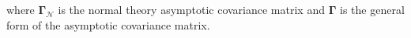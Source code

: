 \noindent where
$\boldsymbol{\Gamma}_{\mathcal{N}}$
is the normal theory asymptotic covariance matrix
and
$\boldsymbol{\Gamma}$
is the general form of the asymptotic covariance matrix.
